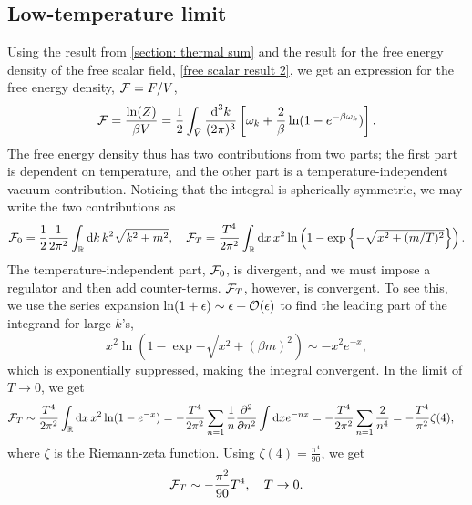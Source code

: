 \subsection{Low-temperature limit}

Using the result from \autoref{section: thermal sum} and the result for the free energy density of the free scalar field, \autoref{free scalar result 2}, we get an expression for the free energy density, $\mathcal{F} = F/V$, 
%
\begin{equation}
    \label{free scalar free enrgy}
    \mathcal{F} = \frac{\ln(Z)}{\beta V}
    = \frac{1}{2} \int_{\tilde V} \frac{\text{d}^3 k}{(2 \pi)^3}
    \left[
        \omega_k + \frac{2}{\beta }\ln(1 - e^{-\beta\omega_k})
    \right].
\end{equation}
%
The free energy density thus has two contributions from two parts; the first part is dependent on temperature, and the other part is a temperature-independent vacuum contribution.
Noticing that the integral is spherically symmetric, we may write the two contributions as
%
\begin{equation}
    \mathcal{F}_0 = \frac{1}{2} \frac{1}{2 \pi^2}\int_{\mathbb{R}} \text{d} k \, k^2 \sqrt{k^2 + m^2}, \quad
    \mathcal{F}_T = \frac{T^4}{2 \pi^2}\int_{\mathbb{R}} \text{d} x \, x^2  
    \ln\left(1 - \text{exp} \left\{ -\sqrt{x^2 + (m/T)^2} \right\}\right).
\end{equation}
%
The temperature-independent part, $\mathcal{F}_0$, is divergent, and we must impose a regulator and then add counter-terms.
$\mathcal{F}_T$, however, is convergent. 
To see this, we use the series expansion $\ln(1 + \epsilon) \sim \epsilon + \mathcal O(\epsilon)$ to find the leading part of the integrand for large $k$'s, 
%
\begin{equation}
    x^2 \ln\left(1 - \exp{-\sqrt{x^2 + (\beta m)^2}}\right) \sim - x^2 e^{-x}, 
\end{equation}
%
which is exponentially suppressed, making the integral convergent.
In the limit of $T \rightarrow 0$, we get
%
\begin{align}
    \nonumber
    \mathcal{F}_T & \sim 
    \frac{T^4}{2 \pi^2} \int_{\mathbb{R}} \text{d} x \, x^2 \ln(1 - e^{-x})
    = - \frac{T^4}{2 \pi^2} \sum_{n=1} \frac{1}{n} \pdv[2]{}{n} \int \text{d} x e^{-nx}
    = - \frac{T^4}{2 \pi^2} \sum_{n=1} \frac{2}{n^4}
    = - \frac{T^4}{\pi^2} \zeta(4),
\end{align}
%
where $\zeta$ is the Riemann-zeta function.
Using $\zeta(4) = \frac{\pi^4}{90}$, we get
%
\begin{equation}
    \mathcal{F}_T \sim - \frac{\pi^2}{90} T^4, \quad T \rightarrow 0.
\end{equation}



